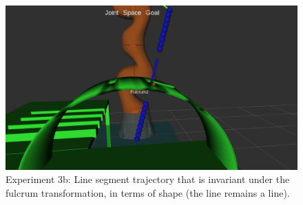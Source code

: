 \begin{center}
\begin{figure}[H]
\centering
\includegraphics[width=\textwidth]{images/robot_planner3/3b_line_seg_invariant.png}
\caption{Experiment 3b: Line segment trajectory that is invariant under the fulcrum transformation, in terms of shape (the line remains a line).}
\label{robot-planner3b-line-seg-invariant}
\end{figure}
\end{center}


